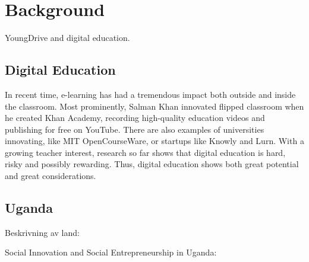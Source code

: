 \section{Background}

YoungDrive and digital education.

	
    
    
    
    \subsection{Digital Education}
    
    In recent time, e-learning has had a tremendous impact both outside and inside the classroom. Most prominently, Salman Khan innovated flipped classroom when he created Khan Academy, recording high-quality education videos and publishing for free on YouTube. There are also examples of universities innovating, like MIT OpenCourseWare, or startups like Knowly and Lurn. With a growing teacher interest, research so far shows that digital education is hard, risky and possibly rewarding. Thus, digital education shows both great potential and great considerations.
    
    \subsection{Uganda}
    
	Beskrivning av land: %
    
    Social Innovation and Social Entrepreneurship in Uganda: %
